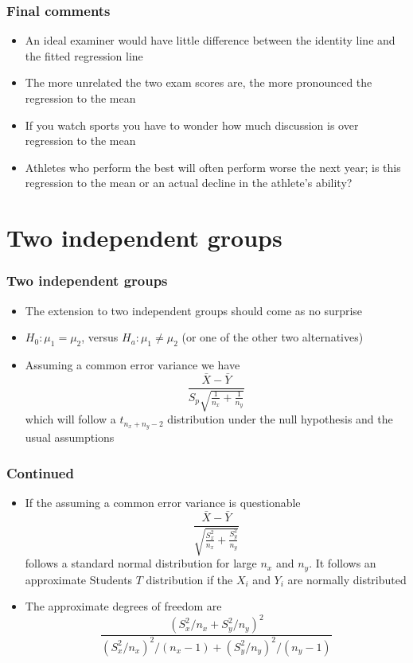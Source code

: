 \documentclass[aspectratio=169]{beamer}
\begin{document}
\begin{frame}\frametitle{Final comments}
  \begin{itemize}
     \item An ideal examiner would have little difference between the identity line
       and the fitted regression line
     \item The more unrelated the two exam scores are, the more pronounced the regression to the mean
     \item If you watch sports you have to wonder how much discussion
       is over regression to the mean
     \item Athletes who perform the best will often perform worse the
       next year; is this regression to the mean or an actual decline
       in the athlete's ability?
  \end{itemize}
  
\end{frame}

\section{Two independent groups}
\begin{frame}\frametitle{Two independent groups}
\begin{itemize}
\item The extension to two independent groups should come as no surprise
\item $H_0:\mu_1 = \mu_2$, versus $H_a:\mu_1 \neq \mu_2$ (or one of the other
  two alternatives)
\item Assuming a common error variance we have
  $$
  \frac{\bar X - \bar Y}{S_p \sqrt{\frac{1}{n_x} +
      \frac{1}{n_y}}}
  $$
  which will follow a $t_{n_x + n_y - 2}$ distribution under the null
  hypothesis and the usual assumptions
\end{itemize}
\end{frame}

\begin{frame}\frametitle{Continued}
\begin{itemize}
\item If the assuming a common error variance is questionable
$$
  \frac{\bar X - \bar Y}{\sqrt{\frac{S_x^2}{n_x} + \frac{S_y^2}{n_y}}}
  $$
  follows a standard normal distribution for large $n_x$ and $n_y$.
  It follows an approximate Students $T$ distribution if the $X_i$ and
  $Y_i$ are normally distributed 
\item The approximate degrees of freedom are
  $$
  \frac{(S_x^2 / n_x + S_y^2 / n_y)^2}{(S_x^2 / n_x)^2 / (n_x - 1) + (S_y^2 / n_y)^2 / (n_y - 1)}
  $$
\end{itemize}
\end{frame}
\end{document}
